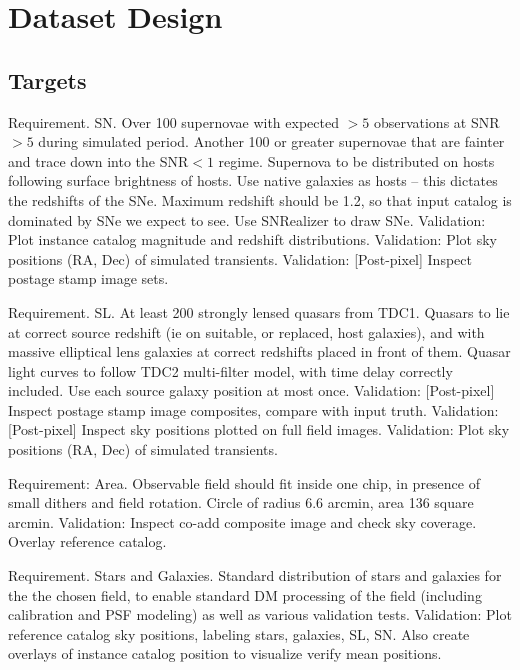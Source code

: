 \section{Dataset Design}
\label{sec:twinkles1:design}



\subsection{Targets}

Requirement. SN. 
Over 100 supernovae with expected $>5$ observations at SNR$>5$ during simulated period.
Another 100 or greater supernovae that are fainter and trace down into the SNR$<1$ regime.
Supernova to be distributed on hosts following surface brightness of hosts. Use native \CatSim
galaxies as hosts -- this dictates the redshifts of the SNe. Maximum redshift should be 1.2, so that input catalog is dominated by SNe we expect to see. Use SNRealizer to draw SNe.
Validation: Plot instance catalog magnitude and redshift distributions.
Validation: Plot sky positions (RA, Dec) of simulated transients.
Validation: [Post-pixel] Inspect postage stamp image sets. 

Requirement. SL.
At least 200 strongly lensed quasars from TDC1. Quasars to lie at correct source redshift (ie on suitable, or replaced, \CatSim host galaxies), and with massive elliptical 
lens galaxies at correct redshifts placed in front of them. Quasar light curves to follow TDC2 multi-filter model, with time delay correctly included. Use each source galaxy position at most once. 
Validation: [Post-pixel] Inspect postage stamp image composites, compare with input truth.
Validation: [Post-pixel] Inspect sky positions plotted on full field images. 
Validation: Plot sky positions (RA, Dec) of simulated transients.

Requirement: Area. 
Observable field should fit inside one chip, in presence of small dithers and field rotation. Circle of radius 6.6 arcmin, area 136 square arcmin. 
Validation: Inspect co-add composite image and check sky coverage. Overlay \CatSim reference catalog. 

Requirement. Stars and Galaxies.
Standard \CatSim distribution of stars and galaxies for the the chosen field, to enable standard DM processing of the field (including calibration and PSF modeling) as well as various validation tests. 
Validation: Plot \CatSim reference catalog sky positions, labeling stars, galaxies, SL, SN.   Also create overlays of instance catalog position to visualize verify mean positions.

